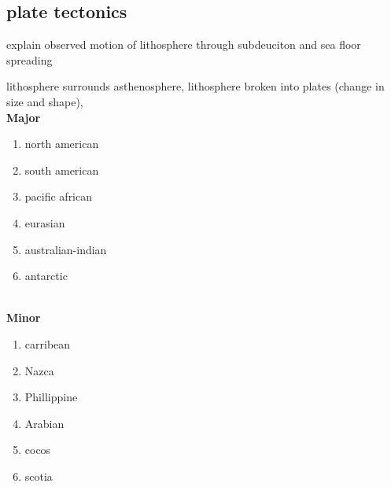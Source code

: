 \documentclass[11pt]{amsart}
\begin{document}
  \subsection{plate tectonics}
  \par explain observed motion of lithosphere through subdeuciton and sea floor
  spreading
  \par lithosphere surrounds asthenosphere, lithosphere broken into plates
  (change in size and shape),
  \\
  \textbf{Major}
  \begin{enumerate}
    \item north american
    \item south american
    \item pacific african
    \item eurasian
    \item australian-indian
    \item antarctic
  \end{enumerate}
  \\
  \textbf{Minor}
  \begin{enumerate}
    \item carribean
    \item Nazca
    \item Phillippine
    \item Arabian
    \item cocos
    \item scotia
  \end{enumerate}
\end{document}

